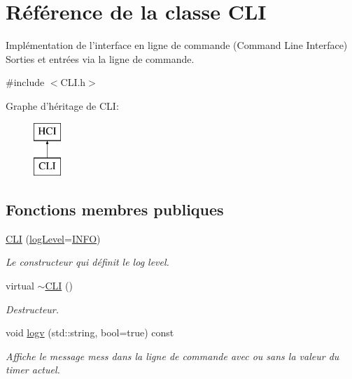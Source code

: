 \hypertarget{classCLI}{\section{Référence de la classe C\-L\-I}
\label{classCLI}
}


Implémentation de l'interface en ligne de commande (Command Line Interface) Sorties et entrées via la ligne de commande.  




{\ttfamily \#include $<$C\-L\-I.\-h$>$}

Graphe d'héritage de C\-L\-I\-:\begin{figure}[H]
\begin{center}
\leavevmode
\includegraphics[height=2.000000cm]{classCLI}
\end{center}
\end{figure}
\subsection*{Fonctions membres publiques}
\begin{DoxyCompactItemize}
\item 
\hyperlink{classCLI_ab29c9ac6d7c2e6b25eeacf0c5fc144a9}{C\-L\-I} (\hyperlink{classHCI_a395f0ab7958108f23c34c7a04b56c4b0}{log\-Level}=\hyperlink{classHCI_a395f0ab7958108f23c34c7a04b56c4b0ab3f339d63b08c4a353f0f6609366d6a2}{I\-N\-F\-O})
\begin{DoxyCompactList}\small\item\em Le constructeur qui définit le log level. \end{DoxyCompactList}\item 
\hypertarget{classCLI_a9f59d57abf434f7161fcf3f61b725752}{virtual \hyperlink{classCLI_a9f59d57abf434f7161fcf3f61b725752}{$\sim$\-C\-L\-I} ()}\label{classCLI_a9f59d57abf434f7161fcf3f61b725752}

\begin{DoxyCompactList}\small\item\em Destructeur. \end{DoxyCompactList}\item 
\hypertarget{classCLI_a844e89b9d79ecf64b1a52cc80fb42663}{void \hyperlink{classCLI_a844e89b9d79ecf64b1a52cc80fb42663}{logv} (std\-::string, bool=true) const }\label{classCLI_a844e89b9d79ecf64b1a52cc80fb42663}

\begin{DoxyCompactList}\small\item\em Affiche le message mess dans la ligne de commande avec ou sans la valeur du timer actuel. \end{DoxyCompactList}\end{DoxyCompactItemize}
